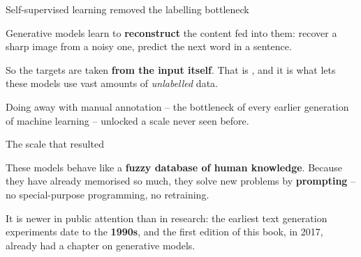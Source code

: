 \documentclass[aspectratio=169,11pt,t]{beamer}
\begin{document}
\begin{frame}[shrink=25]{Self-supervised learning removed the labelling bottleneck}
{\fontsize{9.4}{12.6}\selectfont\color{fg2}Generative models learn to \textbf{reconstruct} the content fed into them: recover a sharp image from a noisy one, predict the next word in a sentence.\par}\vskip 4pt
\begin{iband}[signal]
So the targets are taken \textbf{from the input itself}. That is , and it is what lets these models use vast amounts of \textit{unlabelled} data.
\end{iband}
{\fontsize{9.4}{12.6}\selectfont\color{fg2}Doing away with manual annotation -- the bottleneck of every earlier generation of machine learning -- unlocked a scale never seen before.\par}\vskip 4pt
\end{frame}

\begin{frame}[shrink=25]{The scale that resulted}
\begin{minipage}[t]{0.241\textwidth}
\end{minipage}%
\hfill
\begin{minipage}[t]{0.241\textwidth}
\end{minipage}%
\hfill
\begin{minipage}[t]{0.241\textwidth}
\end{minipage}%
\hfill
\begin{minipage}[t]{0.241\textwidth}
\end{minipage}%
{\fontsize{9.4}{12.6}\selectfont\color{fg2}These models behave like a \textbf{fuzzy database of human knowledge}. Because they have already memorised so much, they solve new problems by \textbf{prompting} -- no special-purpose programming, no retraining.\par}\vskip 4pt
\begin{iband}[amber]
It is newer in public attention than in research: the earliest text generation experiments date to the \textbf{1990s}, and the first edition of this book, in 2017, already had a chapter on generative models.
\end{iband}
\end{frame}
\end{document}
